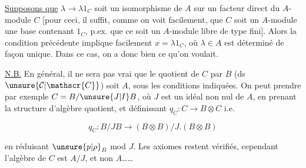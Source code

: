 

\uline{Supposons que} $\lambda\to\lambda1_C$ soit un isomorphisme de $A$ sur un facteur direct du $A$-module $C$ [pour ceci, il suffit, comme on voit facilement, que $C$ soit un $A$-module   une base contenant $1_C$, p.ex. que ce soit un $A$-module libre de type fini]. Alors la condition précédente implique facilement $x=\lambda1_C$, où $\lambda\in A$ est déterminé de façon unique. Dans ce cas, on a donc bien ce qu'on voulait.

\uline{N.B.} En général,  il ne sera pas vrai que le quotient de $C$ par $B$ (ds $\unsure{\mathcal{C}|\mathscr{C}}$) soit $A$, sous les conditions indiquées. On peut prendre par exemple $C=B/\unsure{J|I}B$, où $J$ est un idéal non nul de $A$,   en prenant la structure d'algèbre quotient, et définissant $q_C:C\to B\otimes C$ i.e.

\[
q_C:B/JB\longrightarrow (B\otimes B)/J.(B\otimes B)
\]

en réduisant $\unsure{p|\rho}_B$ mod $J$. Les axiomes restent vérifiés, cependant l'algèbre  de $C$ est $A/J$, et non $A$\ldots\ldots
